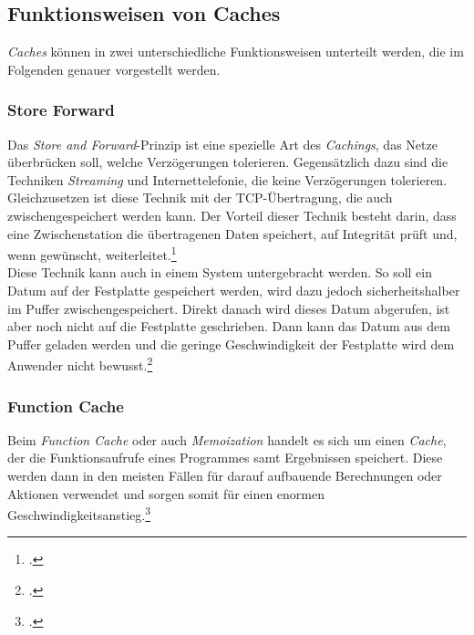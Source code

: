 \subsection{Funktionsweisen von Caches}
\label{ssec:cache-funktionsweisen}
\textit{Caches} können in zwei unterschiedliche Funktionsweisen unterteilt werden, die im Folgenden genauer vorgestellt werden.

\subsubsection*{Store Forward}
\label{sssec:cache-store-forward}
Das \textit{Store and Forward}-Prinzip ist eine spezielle Art des \textit{Cachings}, das Netze überbrücken soll, welche Verzögerungen tolerieren. Gegensätzlich dazu sind die Techniken \textit{Streaming} und Internettelefonie, die keine Verzögerungen tolerieren. Gleichzusetzen ist diese Technik mit der \ac{TCP}-Übertragung, die auch zwischengespeichert werden kann. Der Vorteil dieser Technik besteht darin, dass eine Zwischenstation die übertragenen Daten speichert, auf Integrität prüft und, wenn gewünscht, weiterleitet.\footcite{Cache-StoreForward}\\
Diese Technik kann auch in einem System untergebracht werden. So soll ein Datum auf der Festplatte gespeichert werden, wird dazu jedoch sicherheitshalber im Puffer zwischengespeichert. Direkt danach wird dieses Datum abgerufen, ist aber noch nicht auf die Festplatte geschrieben. Dann kann das Datum aus dem Puffer geladen werden und die geringe Geschwindigkeit der Festplatte wird dem Anwender nicht bewusst.\footcite{Cache-StoreForwardSOA}

\subsubsection*{Function Cache}
\label{sssec:cache-function-cache}
Beim \textit{Function Cache} oder auch \textit{Memoization} handelt es sich um einen \textit{Cache}, der die Funktionsaufrufe eines Programmes samt Ergebnissen speichert. Diese werden dann in den meisten Fällen für darauf aufbauende Berechnungen oder Aktionen verwendet und sorgen somit für einen enormen Geschwindigkeitsanstieg.\footcite{Cache-Memoization}


